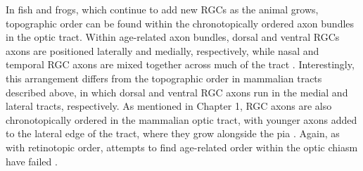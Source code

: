 In fish and frogs, which continue to add new RGCs as the animal grows, topographic order can be found within the chronotopically ordered axon bundles in the optic tract.
Within age-related axon bundles, dorsal and ventral RGCs axons are positioned laterally and medially, respectively, while nasal and temporal RGC axons are mixed together across much of the tract \cite{reh1983organization}.
Interestingly, this arrangement differs from the topographic order in mammalian tracts described above, in which dorsal and ventral RGC axons run in the medial and lateral tracts, respectively.
As mentioned in Chapter 1, RGC axons are also chronotopically ordered in the mammalian optic tract, with younger axons added to the lateral edge of the tract, where they grow alongside the pia \cite{walsh1985age,reese1987distributionrat,reese1990fibre,colello1992observations,reese1997chronotopic}.
Again, as with retinotopic order, attempts to find age-related order within the optic chiasm have failed \cite{colello1998changing}.